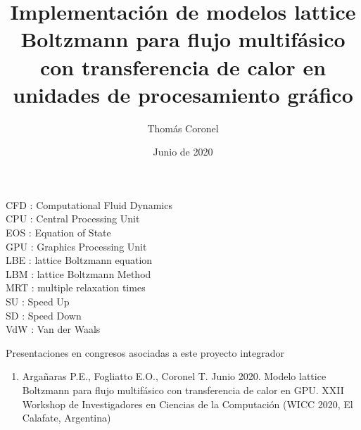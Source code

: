 \documentclass[12pt,papel,oneside]{ibtesis}
\title{Implementación de modelos lattice Boltzmann para flujo multifásico con transferencia de calor en unidades de procesamiento gráfico}
\author{Thomás Coronel}
\date{Junio de 2020}
\begin{document}
  


\begin{preliminary}





\tableofcontents                %

\begin{abreviaturas}
	
	CFD : Computational Fluid Dynamics\\
	
	CPU : Central Processing Unit\\
	
	EOS : Equation of State\\
	
	GPU : Graphics Processing Unit\\
	
	LBE : lattice Boltzmann equation\\
	
	LBM : lattice Boltzmann Method\\
	
	MRT : multiple relaxation times\\
	
	SU  : Speed Up\\
	
	SD : Speed Down\\
	
	VdW : Van der Waals\\
	
	
\end{abreviaturas}

\end{preliminary}








\appendix
%
%

%
%
%
%

\begin{seccion}{Presentaciones en congresos asociadas a este proyecto integrador}
	
	\begin{enumerate}
		
		\item Argañaras P.E., Fogliatto E.O., Coronel T. Junio 2020. Modelo lattice Boltzmann para flujo multifásico con transferencia de calor en GPU. XXII Workshop de Investigadores en Ciencias de la Computación (WICC 2020, El Calafate, Argentina)
		
	\end{enumerate}
	
\end{seccion}
\end{document}
